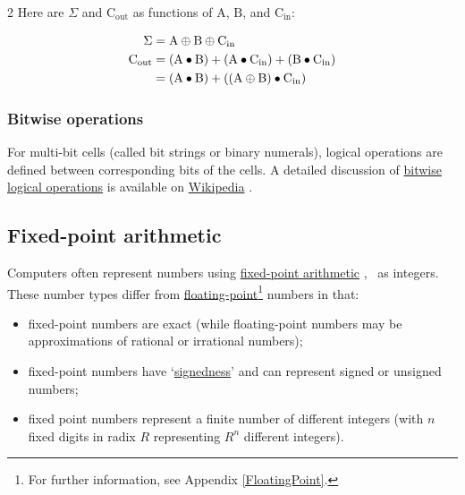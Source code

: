 \documentclass[11pt]{article}%
\begin{document}
\begin{multicols}{2}
Here are $\Sigma$ and $\text{C}_{\text{out}}$ as functions of $\text{A}$, $\text{B}$, and $\text{C}_{\text{in}}$:

\begin{align*}
 \Sigma &= \text{A}\oplus\text{B}\oplus\text{C}_{\text{in}} \\
 \text{C}_{\text{out}} &= \left( \text{A}\bullet\text{B} \right) + \left( \text{A}\bullet\text{C}_{\text{in}} \right) + \left( \text{B}\bullet\text{C}_{\text{in}} \right) \\
 &= \left( \text{A}\bullet\text{B} \right) + \left( \left(\text{A}\oplus\text{B}\right)\bullet\text{C}_{\text{in}} \right) \\
\end{align*}

\subsubsection{Bitwise operations}
\label{Bitwise}

For multi-bit cells (called bit strings or binary numerals), logical operations are defined between corresponding bits of the cells. A detailed discussion of \href{https://en.wikipedia.org/wiki/Bitwise_operation}{bitwise logical operations} is available on \href{https://en.wikipedia.org/}{Wikipedia} \parencite{wiki:bitwise-operation}.

\subsection{Fixed-point arithmetic}
\label{Fixed-point}
Computers often represent numbers using \href{https://en.wikipedia.org/wiki/Fixed-point_arithmetic}{fixed-point arithmetic} \parencite{wiki:fixed-point-arithmetic}, \ie\ as integers. These number types differ from \href{https://en.wikipedia.org/wiki/Floating-point_arithmetic}{floating-point}\footnote{For further information, see Appendix \ref{FloatingPoint}.} \parencite{wiki:floating-point-arithmetic} numbers in that:
\begin{itemize}
\item fixed-point numbers are exact (while floating-point numbers may be approximations of rational or irrational numbers);
\item fixed-point numbers have `\href{https://en.wikipedia.org/wiki/Signedness}{signedness}' \parencite{wiki:signedness} and can represent signed or unsigned numbers;
\item fixed point numbers represent a finite number of different integers (with $n$ fixed digits in radix $R$ representing $R^{n}$ different integers).
\end{itemize}


\end{multicols}
\end{document}
